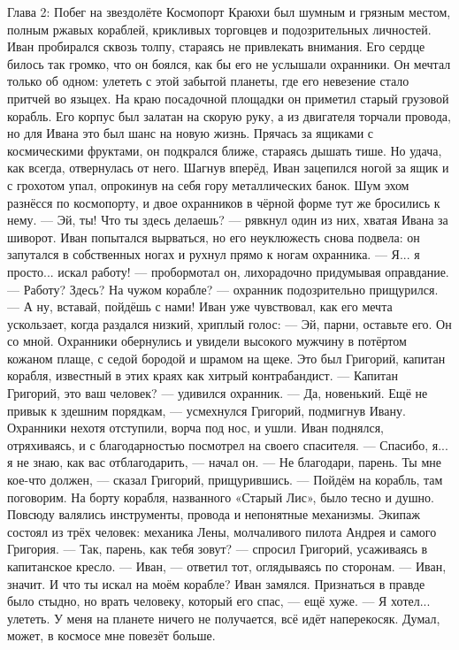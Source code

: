 \documentclass[12pt,a4paper]{book}
\begin{document}
Глава 2: Побег на звездолёте
Космопорт Краюхи был шумным и грязным местом, полным ржавых кораблей, крикливых торговцев и подозрительных личностей. Иван пробирался сквозь толпу, стараясь не привлекать внимания. Его сердце билось так громко, что он боялся, как бы его не услышали охранники. Он мечтал только об одном: улететь с этой забытой планеты, где его невезение стало притчей во языцех.
На краю посадочной площадки он приметил старый грузовой корабль. Его корпус был залатан на скорую руку, а из двигателя торчали провода, но для Ивана это был шанс на новую жизнь. Прячась за ящиками с космическими фруктами, он подкрался ближе, стараясь дышать тише.
Но удача, как всегда, отвернулась от него. Шагнув вперёд, Иван зацепился ногой за ящик и с грохотом упал, опрокинув на себя гору металлических банок. Шум эхом разнёсся по космопорту, и двое охранников в чёрной форме тут же бросились к нему.
— Эй, ты! Что ты здесь делаешь? — рявкнул один из них, хватая Ивана за шиворот.
Иван попытался вырваться, но его неуклюжесть снова подвела: он запутался в собственных ногах и рухнул прямо к ногам охранника.
— Я... я просто... искал работу! — пробормотал он, лихорадочно придумывая оправдание.
— Работу? Здесь? На чужом корабле? — охранник подозрительно прищурился. — А ну, вставай, пойдёшь с нами!
Иван уже чувствовал, как его мечта ускользает, когда раздался низкий, хриплый голос:
— Эй, парни, оставьте его. Он со мной.
Охранники обернулись и увидели высокого мужчину в потёртом кожаном плаще, с седой бородой и шрамом на щеке. Это был Григорий, капитан корабля, известный в этих краях как хитрый контрабандист.
— Капитан Григорий, это ваш человек? — удивился охранник.
— Да, новенький. Ещё не привык к здешним порядкам, — усмехнулся Григорий, подмигнув Ивану.
Охранники нехотя отступили, ворча под нос, и ушли. Иван поднялся, отряхиваясь, и с благодарностью посмотрел на своего спасителя.
— Спасибо, я... я не знаю, как вас отблагодарить, — начал он.
— Не благодари, парень. Ты мне кое-что должен, — сказал Григорий, прищурившись. — Пойдём на корабль, там поговорим.
На борту корабля, названного «Старый Лис», было тесно и душно. Повсюду валялись инструменты, провода и непонятные механизмы. Экипаж состоял из трёх человек: механика Лены, молчаливого пилота Андрея и самого Григория.
— Так, парень, как тебя зовут? — спросил Григорий, усаживаясь в капитанское кресло.
— Иван, — ответил тот, оглядываясь по сторонам.
— Иван, значит. И что ты искал на моём корабле?
Иван замялся. Признаться в правде было стыдно, но врать человеку, который его спас, — ещё хуже.
— Я хотел... улететь. У меня на планете ничего не получается, всё идёт наперекосяк. Думал, может, в космосе мне повезёт больше.
\end{document}
